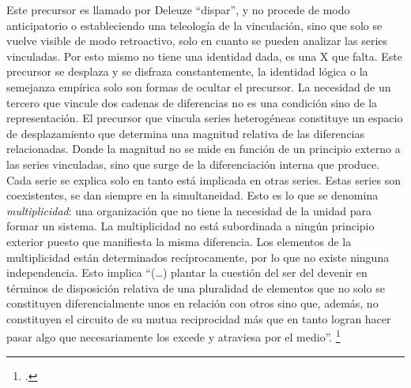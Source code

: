 Este precursor es llamado por Deleuze \enquote{dispar}, y no procede de modo anticipatorio o estableciendo una teleología de la vinculación, sino que solo se vuelve visible de modo retroactivo, solo en cuanto se pueden analizar las series vinculadas. Por esto mismo no tiene una identidad dada, es una X que falta. Este precursor se desplaza y se disfraza constantemente, la identidad lógica o la semejanza empírica solo son formas de ocultar el precursor. La necesidad de un tercero que vincule dos cadenas de diferencias no es una condición sino de la representación. El precursor que vincula series heterogéneas constituye un espacio de desplazamiento que determina una magnitud relativa de las diferencias relacionadas. Donde la magnitud no se mide en función de un principio externo a las series vinculadas, sino que surge de la diferenciación interna que produce. Cada serie se explica solo en tanto está implicada en otras series. Estas series son coexistentes, se dan siempre en la simultaneidad. Esto es lo que se denomina \emph{multiplicidad}: una organización que no tiene la necesidad de la unidad para formar un sistema. La multiplicidad no está subordinada a ningún principio exterior puesto que manifiesta la misma diferencia. Los elementos de la multiplicidad están determinados recíprocamente, por lo que no existe ninguna independencia. Esto implica \enquote{(\ldots) plantar la cuestión del ser del devenir en términos de disposición relativa de una pluralidad de elementos que no solo se constituyen diferencialmente unos en relación con otros sino que, además, no constituyen el circuito de su mutua reciprocidad más que en tanto logran hacer pasar algo que necesariamente los excede y atraviesa por el medio}. \footcite[15]{@6979-GALLEGO2008}

